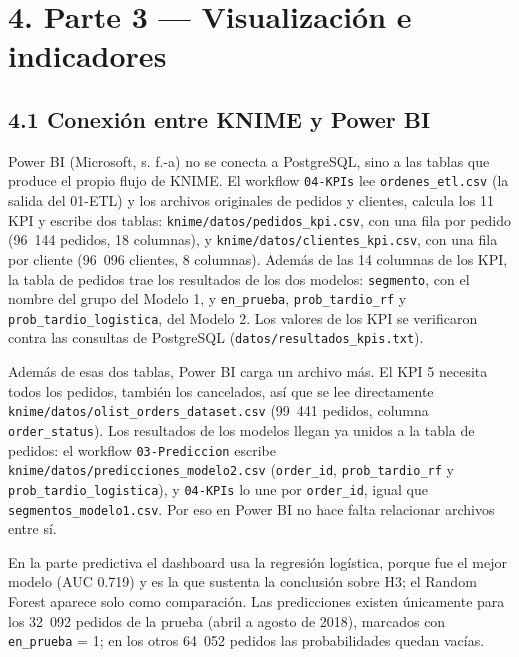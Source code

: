 \documentclass[a4paper,stu,12pt,donotrepeattitle,floatsintext]{apa7}
\begin{document}
\section{4. Parte 3 — Visualización e indicadores}
\subsection{4.1 Conexión entre KNIME y Power BI}
Power BI (Microsoft, s. f.-a) no se conecta a PostgreSQL, sino a las tablas que produce el propio flujo de KNIME. El workflow \texttt{04-KPIs} lee \texttt{ordenes\_\allowbreak{}etl.csv} (la salida del 01-ETL) y los archivos originales de pedidos y clientes, calcula los 11 KPI y escribe dos tablas: \texttt{knime/\allowbreak{}datos/\allowbreak{}pedidos\_\allowbreak{}kpi.csv}, con una fila por pedido (96~144 pedidos, 18 columnas), y \texttt{knime/\allowbreak{}datos/\allowbreak{}clientes\_\allowbreak{}kpi.csv}, con una fila por cliente (96~096 clientes, 8 columnas). Además de las 14 columnas de los KPI, la tabla de pedidos trae los resultados de los dos modelos: \texttt{segmento}, con el nombre del grupo del Modelo 1, y \texttt{en\_\allowbreak{}prueba}, \texttt{prob\_\allowbreak{}tardio\_\allowbreak{}rf} y \texttt{prob\_\allowbreak{}tardio\_\allowbreak{}logistica}, del Modelo 2. Los valores de los KPI se verificaron contra las consultas de PostgreSQL (\texttt{datos/\allowbreak{}resultados\_\allowbreak{}kpis.txt}).

Además de esas dos tablas, Power BI carga un archivo más. El KPI 5 necesita todos los pedidos, también los cancelados, así que se lee directamente \texttt{knime/\allowbreak{}datos/\allowbreak{}olist\_\allowbreak{}orders\_\allowbreak{}dataset.csv} (99~441 pedidos, columna \texttt{order\_\allowbreak{}status}). Los resultados de los modelos llegan ya unidos a la tabla de pedidos: el workflow \texttt{03-Prediccion} escribe \texttt{knime/\allowbreak{}datos/\allowbreak{}predicciones\_\allowbreak{}modelo2.csv} (\texttt{order\_\allowbreak{}id}, \texttt{prob\_\allowbreak{}tardio\_\allowbreak{}rf} y \texttt{prob\_\allowbreak{}tardio\_\allowbreak{}logistica}), y \texttt{04-KPIs} lo une por \texttt{order\_\allowbreak{}id}, igual que \texttt{segmentos\_\allowbreak{}modelo1.csv}. Por eso en Power BI no hace falta relacionar archivos entre sí.

En la parte predictiva el dashboard usa la regresión logística, porque fue el mejor modelo (AUC 0.719) y es la que sustenta la conclusión sobre H3; el Random Forest aparece solo como comparación. Las predicciones existen únicamente para los 32~092 pedidos de la prueba (abril a agosto de 2018), marcados con \texttt{en\_\allowbreak{}prueba} = 1; en los otros 64~052 pedidos las probabilidades quedan vacías.
\end{document}
